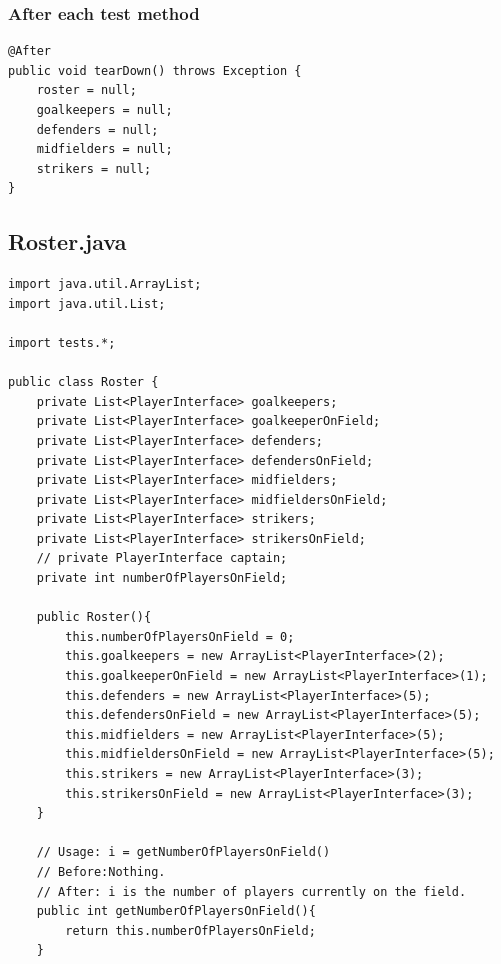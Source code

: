 \documentclass{article}
\begin{document}
\subsubsection*{After each test method}
\begin{lstlisting}
@After
public void tearDown() throws Exception {
	roster = null;
	goalkeepers = null;
	defenders = null;
	midfielders = null;
	strikers = null;
}
\end{lstlisting}

\subsection*{Roster.java}
\begin{lstlisting}
import java.util.ArrayList;
import java.util.List;

import tests.*;

public class Roster {
	private List<PlayerInterface> goalkeepers;
	private List<PlayerInterface> goalkeeperOnField;
	private List<PlayerInterface> defenders;
	private List<PlayerInterface> defendersOnField;
	private List<PlayerInterface> midfielders;
	private List<PlayerInterface> midfieldersOnField;
	private List<PlayerInterface> strikers;
	private List<PlayerInterface> strikersOnField;
	// private PlayerInterface captain;
	private int numberOfPlayersOnField;
	
	public Roster(){
		this.numberOfPlayersOnField = 0;
		this.goalkeepers = new ArrayList<PlayerInterface>(2);
		this.goalkeeperOnField = new ArrayList<PlayerInterface>(1);
		this.defenders = new ArrayList<PlayerInterface>(5);
		this.defendersOnField = new ArrayList<PlayerInterface>(5);
		this.midfielders = new ArrayList<PlayerInterface>(5);
		this.midfieldersOnField = new ArrayList<PlayerInterface>(5);
		this.strikers = new ArrayList<PlayerInterface>(3);
		this.strikersOnField = new ArrayList<PlayerInterface>(3);
	}
	
	// Usage: i = getNumberOfPlayersOnField()
	// Before:Nothing.
	// After: i is the number of players currently on the field.
	public int getNumberOfPlayersOnField(){
		return this.numberOfPlayersOnField;
	}
	

\end{lstlisting}
\end{document}
